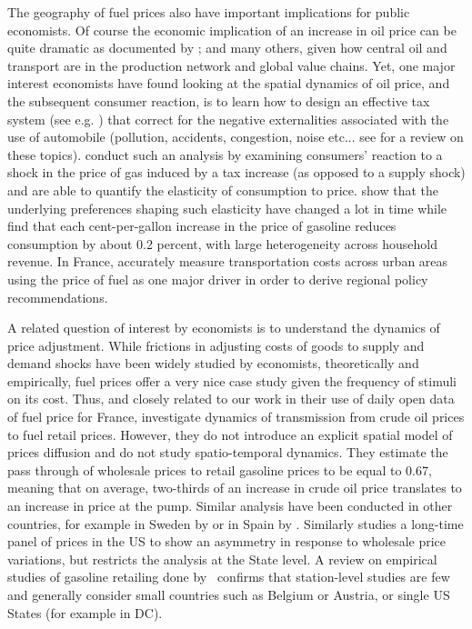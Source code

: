 \documentclass[10pt]{article}
\begin{document}
The geography of fuel prices also have important implications for public economists. Of course the economic implication of an increase in oil price can be quite dramatic as documented by \citet{kilian2008}; \citet{hamilton2009} and many others, given how central oil and transport are in the production network and global value chains. Yet, one major interest economists have found looking at the spatial dynamics of oil price, and the subsequent consumer reaction, is to learn how to design an effective tax system (see e.g. \citealt{parry2005does}) that correct for the negative externalities associated with the use of automobile (pollution, accidents, congestion, noise etc... see \citealt{parry2007automobile} for a review on these topics). \citet{li2014gasoline} conduct such an analysis by examining consumers' reaction to a shock in the price of gas induced by a tax increase (as opposed to a supply shock) and are able to quantify the elasticity of consumption to price. \citet{Hughes2006} show that the underlying preferences shaping such elasticity have changed a lot in time while \citet{bento2009} find that each cent-per-gallon increase in the price of gasoline reduces consumption by about 0.2 percent, with large heterogeneity across household revenue. In France, \cite{combes2005transport} accurately measure transportation costs across urban areas using the price of fuel as one major driver in order to derive regional policy recommendations.

A related question of interest by economists is to understand the dynamics of price adjustment. While frictions in adjusting costs of goods to supply and demand shocks have been widely studied by economists, theoretically and empirically, fuel prices offer a very nice case study given the frequency of stimuli on its cost. Thus, and closely related to our work in their use of daily open data of fuel price for France, \cite{gautier2015dynamics} investigate dynamics of transmission from crude oil prices to fuel retail prices. However, they do not introduce an explicit spatial model of prices diffusion and do not study spatio-temporal dynamics. They estimate the pass through of wholesale prices to retail gasoline prices to be equal to 0.67, meaning that on average, two-thirds of an increase in crude oil price translates to an increase in price at the pump. Similar analysis have been conducted in other countries, for example in Sweden by \citet{asplund2000price} or in Spain by \citet{stolper2016bears}. Similarly \cite{deltas2008retail} studies a long-time panel of prices in the US to show an asymmetry in response to wholesale price variations, but restricts the analysis at the State level. A review on empirical studies of gasoline retailing done by~\cite{eckert2013empirical} confirms that station-level studies are few and generally consider small countries such as Belgium or Austria, or single US States (for example \citealt{hosken2008retail} in DC).
\end{document}
